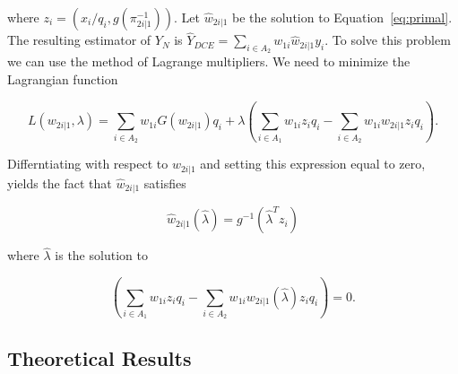 \documentclass[12pt]{article}
\begin{document}
where  $z_i = (x_i / q_i, g(\pi_{2i|1}^{-1}))$. 
Let $\hat w_{2i|1}$ be the solution to Equation~\eqref{eq:primal}. The resulting 
estimator of $Y_N$ is $\hat Y_{DCE} = \sum_{i \in A_2} w_{1i} \hat w_{2i|1} y_i$.
To solve this problem we can use the method of Lagrange multipliers. We need to
minimize the Lagrangian function

\begin{equation}\label{eq:legragedc1}
  L(w_{2i|1}, \lambda) = \sum_{i \in A_2} w_{1i} G(w_{2i|1}) q_i + \lambda 
  \left( \sum_{i \in A_1} w_{1i} z_i q_i -
    \sum_{i \in A_2} w_{1i} w_{2i|1} z_i q_i\right).
\end{equation}

Differntiating with respect to $w_{2i|1}$ and setting this expression equal to
zero, yields the fact that $\hat w_{2i|1}$ satisfies 

$$ \hat w_{2i|1}(\hat \lambda) = g^{-1}(\hat \lambda^T z_i) $$

where $\hat \lambda$ is the solution to

\begin{equation}\label{eq:lamdc1}
  \left( \sum_{i \in A_1} w_{1i} z_i q_i -
    \sum_{i \in A_2} w_{1i} w_{2i|1}(\hat \lambda) z_i q_i\right) = 0.
\end{equation}

\subsection{Theoretical Results}
\end{document}
